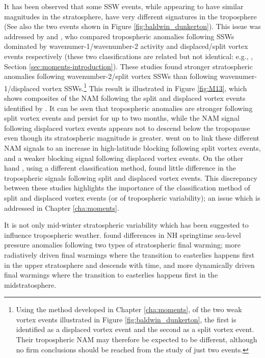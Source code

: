 It has been observed that some SSW events, while appearing to have similar
magnitudes in the stratosphere, have very different signatures in the
troposphere \citep[e.g.,][]{Baldwin2001a,Tomassini2012} (See also the two events
shown in Figure \ref{fig:baldwin_dunkerton}). This issue was addressed by
\citet{Nakagawa2006} and \citet{Mitchell2013}, who compared tropospheric
anomalies following SSWs dominated by wavenumer-1/wavenumber-2 activity and
displaced/split vortex events respectively (these two classifications are
related but not identical: e.g., \citet{Waugh1997}, Section
\ref{sec:moments-introduction}). These studies found stronger stratospheric
anomalies following wavenumber-2/split vortex SSWs than following
wavenumer-1/displaced vortex SSWs.\footnote{Using the method developed in
  Chapter \ref{cha:moments}, of the two weak vortex events illustrated in Figure
  \ref{fig:baldwin_dunkerton}, the first is identified as a displaced vortex
  event and the second as a split vortex event. Their tropospheric NAM may
  therefore be expected to be different, although no firm conclusions should be
  reached from the study of just two events.} This result is illustrated in
Figure \ref{fig:M13}, which shows composites of the NAM following the split and
displaced vortex events identified by \citet{Mitchell2013}. It can be seen that
tropospheric anomalies are stronger following split vortex events and persist
for up to two months, while the NAM signal following displaced vortex events
appears not to descend below the tropopause even though its stratospheric
magnitude is greater. \citet{Mitchell2013} went on to link these different NAM
signals to an increase in high-latitude blocking following split vortex events,
and a weaker blocking signal following displaced vortex events. On the other
hand \citet{Charlton2007a}, using a different classification method, found
little difference in the tropospheric signals following split and displaced
vortex events. This discrepancy between these studies highlights the importance
of the classification method of split and displaced vortex events (or of
tropospheric variability); an issue which is addressed in Chapter
\ref{cha:moments}.

It is not only mid-winter stratospheric variability which has been suggested to
influence tropospheric weather. \citet{Hardiman2011} found differences
in NH springtime sea-level pressure anomalies following two types of
stratospheric final warming; more radiatively driven final warmings where the
transition to easterlies happens first in the upper stratosphere and descends
with time, and more dynamically driven final warmings where the transition to
easterlies happens first in the midstratosphere.  

